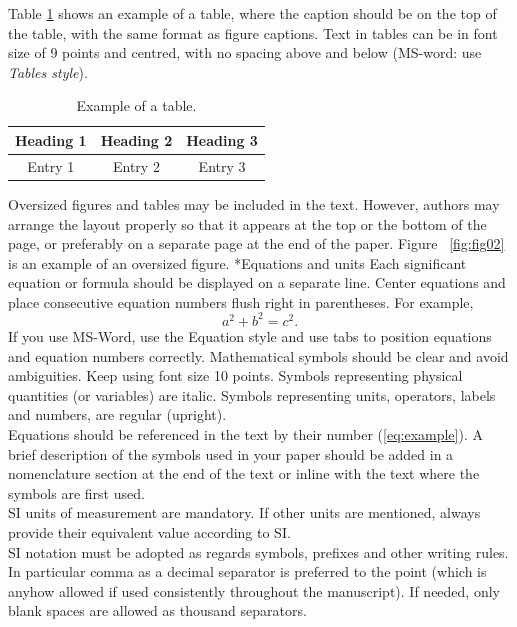 \documentclass[twocolumn, a4paper,10pt]{article}
\makeatletter
\renewcommand\subsection{\@startsection{subsection}{1}{\z@}{\z@}{\z@}{\normalfont\normalsize\bfseries}}
\renewcommand\subsection{\@startsection{subsection}{1}{\z@}{\z@}{0.1pt}{\normalfont\normalsize\bfseries}}
\makeatother
\begin{document}
Table \ref{tab:tab01} shows an example of a table, where the caption should be on the top of the table, with the same format as figure captions. Text in tables can be in font size of 9 points and centred, with no spacing above and below (MS-word: use \textit{Tables style}).
\begin{table}[ht]
\vspace{-5pt}   %
\caption{Example of a table.}
\label{tab:tab01}
\centering
\begin{tabular}{| c | c | c | }
  \hline
  \bf{Heading 1} & \bf{Heading} 2 & \bf{Heading 3} \\
  \hline
  Entry 1 & Entry 2 & Entry 3 \\
  \hline
\end{tabular}
\vspace{-5pt}   %
\end{table}
Oversized figures and tables may be included in the text. However, authors may arrange the layout properly so that it appears at the top or the bottom of the page, or preferably on a separate page at the end of the paper. Figure ~\ref{fig:fig02} is an example of an oversized figure.
\subsection*{Equations and units}
Each significant equation or formula should be displayed on a separate line. Center equations and place consecutive equation numbers flush right in parentheses. For example,
\begin{equation}\label{eq:example}
  a^2+b^2=c^2.
\end{equation}
If you use MS-Word, use the Equation style and use tabs to position equations and equation numbers correctly.
Mathematical symbols should be clear and avoid ambiguities. Keep using font size 10 points. Symbols representing physical quantities (or variables) are italic. Symbols representing units, operators, labels and numbers, are regular (upright).\\
Equations should be referenced in the text by their number (\ref{eq:example}). A brief description of the symbols used in your paper should be added in a nomenclature section at the end of the text or inline with the text where the symbols are first used.\\
SI units of measurement are mandatory. If other units are mentioned, always provide their equivalent value according to SI.\\
SI notation must be adopted as regards symbols, prefixes and other writing rules. In particular comma as a decimal separator is preferred to the point (which is anyhow allowed if used consistently throughout the manuscript). If needed, only blank spaces are allowed as thousand separators.
\end{document}
